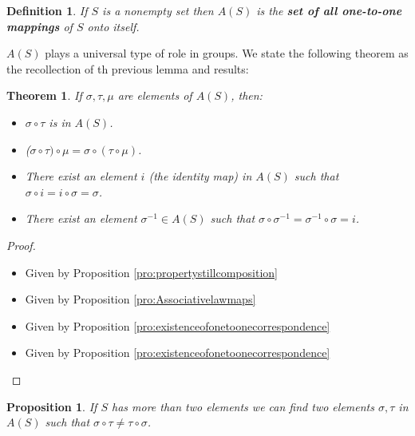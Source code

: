 \documentclass[11pt,a4paper]{article}
\newtheorem{define}{Definition}
\newtheorem{thm}{Theorem}
\newtheorem{claim}{Proposition}
\begin{document}
\begin{define}
	If $S$ is a nonempty set then $A(S)$ is the \textbf{set of all one-to-one mappings} of $S$ onto itself.
\end{define}
$A(S)$ plays a universal type of role in groups.
We state the following theorem as the recollection of th previous lemma and results:
\begin{thm}
	If $ \sigma, \tau, \mu $ are elements of $ A(S) $, then:
	\begin{itemize}
		\item $ \sigma \circ \tau $ is in $ A(S) $.
		\item ($\sigma \circ \tau) \circ \mu = \sigma \circ (\tau \circ \mu)$.
		\item There exist an element $i$ (the identity map) in $A(S)$ such that $ \sigma \circ i = i \circ \sigma = \sigma$.
		\item There exist an element $ \sigma^{-1} \in A(S)$ such that $ \sigma \circ \sigma^{-1} = \sigma^{-1} \circ \sigma = i$.
	\end{itemize}
\end{thm}
\begin{proof}
	\begin{itemize}
		\item Given by Proposition \ref{pro:propertystillcomposition}
		\item Given by Proposition \ref{pro:Associativelawmaps}
		\item Given by Proposition \ref{pro:existenceofonetoonecorrespondence}
		\item Given by Proposition \ref{pro:existenceofonetoonecorrespondence}
	\end{itemize}
\end{proof}

\begin{claim}
	If $S$ has more than two elements we can find two elements $\sigma, \tau$ in $A(S)$ such that $ \sigma \circ \tau \neq \tau \circ \sigma$.
\end{claim}
	
\end{document}
